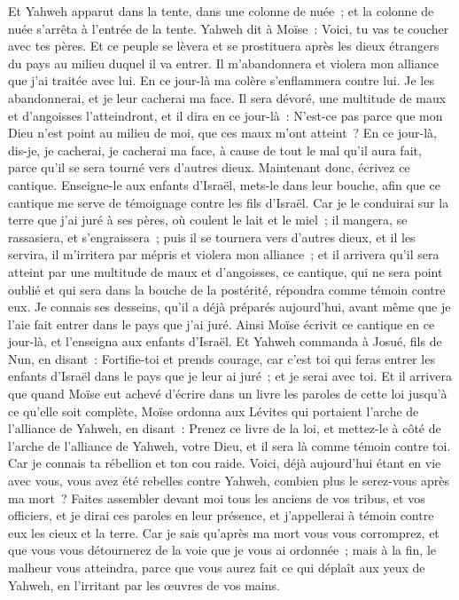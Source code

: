 \begin{multicols}{2}
Et Yahweh apparut dans la tente, dans une colonne de nuée~; et la colonne de nuée s'arrêta à l'entrée de la tente.
Yahweh dit à Moïse~: Voici, tu vas te coucher avec tes pères. Et ce peuple se lèvera et se prostituera après les dieux étrangers du pays au milieu duquel il va entrer. Il m'abandonnera et violera mon alliance que j'ai traitée avec lui.
En ce jour-là ma colère s'enflammera contre lui. Je les abandonnerai, et je leur cacherai ma face. Il sera dévoré, une multitude de maux et d'angoisses l'atteindront, et il dira en ce jour-là~: N'est-ce pas parce que mon Dieu n'est point au milieu de moi, que ces maux m'ont atteint~?
En ce jour-là, dis-je, je cacherai, je cacherai ma face, à cause de tout le mal qu'il aura fait, parce qu'il se sera tourné vers d'autres dieux.
Maintenant donc, écrivez ce cantique. Enseigne-le aux enfants d'Israël, mets-le dans leur bouche, afin que ce cantique me serve de témoignage contre les fils d'Israël.
Car je le conduirai sur la terre que j'ai juré à ses pères, où coulent le lait et le miel~; il mangera, se rassasiera, et s'engraissera~; puis il se tournera vers d'autres dieux, et il les servira, il m'irritera par mépris et violera mon alliance~;
et il arrivera qu'il sera atteint par une multitude de maux et d'angoisses, ce cantique, qui ne sera point oublié et qui sera dans la bouche de la postérité, répondra comme témoin contre eux. Je connais ses desseins, qu'il a déjà préparés aujourd'hui, avant même que je l'aie fait entrer dans le pays que j'ai juré.
Ainsi Moïse écrivit ce cantique en ce jour-là, et l'enseigna aux enfants d'Israël.
Et Yahweh commanda à Josué, fils de Nun, en disant~: Fortifie-toi et prends courage, car c'est toi qui feras entrer les enfants d'Israël dans le pays que je leur ai juré~; et je serai avec toi.
Et il arrivera que quand Moïse eut achevé d'écrire dans un livre les paroles de cette loi jusqu'à ce qu'elle soit complète,
Moïse ordonna aux Lévites qui portaient l'arche de l'alliance de Yahweh, en disant~:
Prenez ce livre de la loi, et mettez-le à côté de l'arche de l'alliance de Yahweh, votre Dieu, et il sera là comme témoin contre toi.
Car je connais ta rébellion et ton cou raide. Voici, déjà aujourd'hui étant en vie avec vous, vous avez été rebelles contre Yahweh, combien plus le serez-vous après ma mort~?
Faites assembler devant moi tous les anciens de vos tribus, et vos officiers, et je dirai ces paroles en leur présence, et j'appellerai à témoin contre eux les cieux et la terre.
Car je sais qu'après ma mort vous vous corromprez, et que vous vous détournerez de la voie que je vous ai ordonnée~; mais à la fin, le malheur vous atteindra, parce que vous aurez fait ce qui déplaît aux yeux de Yahweh, en l'irritant par les œuvres de vos mains.

\end{multicols}
